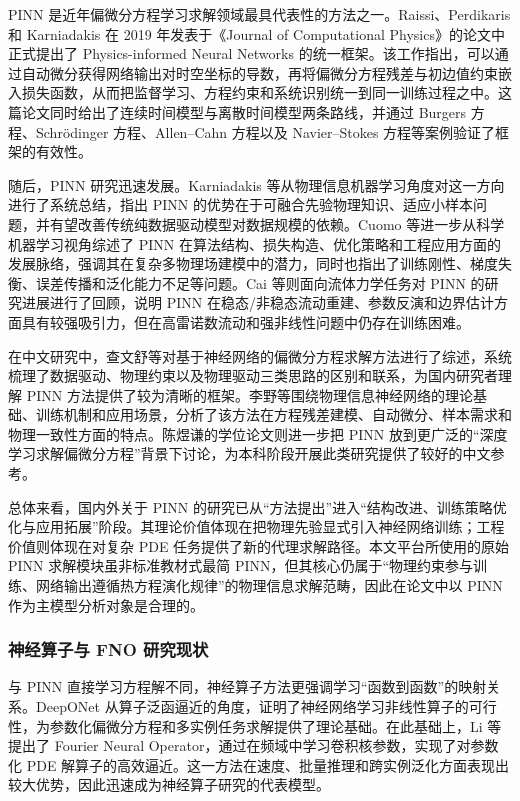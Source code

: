 \documentclass[UTF8,zihao=-4]{oucart}
\begin{document}
PINN 是近年偏微分方程学习求解领域最具代表性的方法之一。Raissi、Perdikaris 和 Karniadakis 在 2019 年发表于《Journal of Computational Physics》的论文中正式提出了 Physics-informed Neural Networks 的统一框架\cite{raissi2019}。该工作指出，可以通过自动微分获得网络输出对时空坐标的导数，再将偏微分方程残差与初边值约束嵌入损失函数，从而把监督学习、方程约束和系统识别统一到同一训练过程之中。这篇论文同时给出了连续时间模型与离散时间模型两条路线，并通过 Burgers 方程、Schrödinger 方程、Allen--Cahn 方程以及 Navier--Stokes 方程等案例验证了框架的有效性。

随后，PINN 研究迅速发展。Karniadakis 等从物理信息机器学习角度对这一方向进行了系统总结，指出 PINN 的优势在于可融合先验物理知识、适应小样本问题，并有望改善传统纯数据驱动模型对数据规模的依赖\cite{karniadakis2021}。Cuomo 等进一步从科学机器学习视角综述了 PINN 在算法结构、损失构造、优化策略和工程应用方面的发展脉络，强调其在复杂多物理场建模中的潜力，同时也指出了训练刚性、梯度失衡、误差传播和泛化能力不足等问题\cite{cuomo2022}。Cai 等则面向流体力学任务对 PINN 的研究进展进行了回顾，说明 PINN 在稳态/非稳态流动重建、参数反演和边界估计方面具有较强吸引力，但在高雷诺数流动和强非线性问题中仍存在训练困难\cite{cai2021fluid}。

在中文研究中，查文舒等对基于神经网络的偏微分方程求解方法进行了综述，系统梳理了数据驱动、物理约束以及物理驱动三类思路的区别和联系，为国内研究者理解 PINN 方法提供了较为清晰的框架\cite{zha2022review}。李野等围绕物理信息神经网络的理论基础、训练机制和应用场景，分析了该方法在方程残差建模、自动微分、样本需求和物理一致性方面的特点\cite{liye2022pinnreview}。陈煜谦的学位论文则进一步把 PINN 放到更广泛的“深度学习求解偏微分方程”背景下讨论，为本科阶段开展此类研究提供了较好的中文参考\cite{chen2024deeppde}。

总体来看，国内外关于 PINN 的研究已从“方法提出”进入“结构改进、训练策略优化与应用拓展”阶段。其理论价值体现在把物理先验显式引入神经网络训练；工程价值则体现在对复杂 PDE 任务提供了新的代理求解路径。本文平台所使用的原始 PINN 求解模块虽非标准教材式最简 PINN，但其核心仍属于“物理约束参与训练、网络输出遵循热方程演化规律”的物理信息求解范畴，因此在论文中以 PINN 作为主模型分析对象是合理的。

\subsubsection{神经算子与 FNO 研究现状}

与 PINN 直接学习方程解不同，神经算子方法更强调学习“函数到函数”的映射关系。DeepONet 从算子泛函逼近的角度，证明了神经网络学习非线性算子的可行性，为参数化偏微分方程和多实例任务求解提供了理论基础\cite{lu2021deeponet}。在此基础上，Li 等提出了 Fourier Neural Operator，通过在频域中学习卷积核参数，实现了对参数化 PDE 解算子的高效逼近\cite{li2021fno}。这一方法在速度、批量推理和跨实例泛化方面表现出较大优势，因此迅速成为神经算子研究的代表模型。
\end{document}
